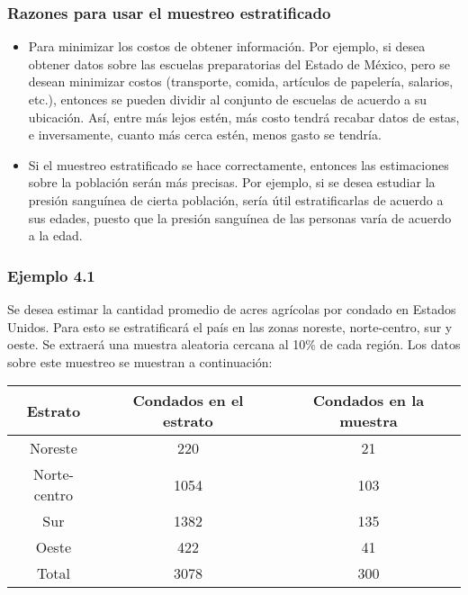 \documentclass[hyperref={bookmarks=false},aspectratio=169, 10pt]{beamer}
\begin{document}

\begin{frame}
  \frametitle{Razones para usar el muestreo estratificado}
    \begin{itemize}
        \item<1-> Para minimizar los costos de obtener información. Por ejemplo, si desea obtener datos sobre las escuelas preparatorias del Estado de México, pero se desean minimizar costos (transporte, comida, artículos de papelería, salarios, etc.), entonces se pueden dividir al conjunto de escuelas de acuerdo a su ubicación. Así, entre más lejos estén, más costo tendrá recabar datos de estas, e inversamente, cuanto más cerca estén, menos gasto se tendría. 
        \item<2-> Si el muestreo estratificado se hace correctamente, entonces las estimaciones sobre la población serán más precisas. Por ejemplo, si se desea estudiar la presión sanguínea de cierta población, sería útil estratificarlas de acuerdo a sus edades, puesto que la presión sanguínea de las personas varía de acuerdo a la edad.
    \end{itemize}
\end{frame}


\begin{frame}
  \frametitle{Ejemplo 4.1}
    Se desea estimar la cantidad promedio de acres agrícolas por condado en Estados Unidos. Para esto se estratificará el país en las zonas noreste, norte-centro, sur y oeste. Se extraerá una muestra aleatoria cercana al 10$\%$ de cada región. Los datos sobre este muestreo se muestran a continuación:

    \begin{table}
        \centering
        \begin{tabular}{|c|c|c|}
            \hline
            \textbf{Estrato} & \textbf{Condados en el estrato} & \textbf{Condados en la muestra}\\
            \hline
            Noreste & 220 & 21 \\
            \hline
            Norte-centro & 1054 & 103 \\
            \hline
            Sur & 1382 & 135 \\
            \hline
            Oeste & 422 & 41 \\
            \hline\hline
            Total & 3078 & 300 \\
            \hline
        \end{tabular}
    \end{table}
\end{frame}
\end{document}
